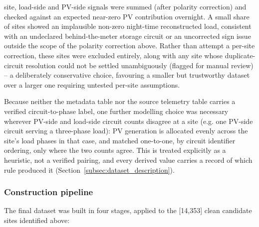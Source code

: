 \begin{enumerate}
    site, load-side and PV-side signals were summed (after polarity
    correction) and checked against an expected near-zero PV contribution
    overnight. A small share of sites showed an implausible non-zero
    night-time reconstructed load, consistent with an undeclared
    behind-the-meter storage circuit or an uncorrected sign issue outside
    the scope of the polarity correction above. Rather than attempt a
    per-site correction, these sites were excluded entirely, along with
    any site whose duplicate-circuit resolution could not be settled
    unambiguously (flagged for manual review) -- a deliberately
    conservative choice, favouring a smaller but trustworthy dataset over
    a larger one requiring untested per-site assumptions.
\end{enumerate}

Because neither the metadata table nor the source telemetry table carries
a verified circuit-to-phase label, one further modelling choice was
necessary wherever PV-side and load-side circuit counts disagree at a
site (e.g. one PV-side circuit serving a three-phase load): PV generation
is allocated evenly across the site's load phases in that case, and
matched one-to-one, by circuit identifier ordering, only where the two
counts agree. This is treated explicitly as a heuristic, not a verified
pairing, and every derived value carries a record of which rule produced
it (Section~\ref{subsec:dataset_description}).

\subsubsection*{Construction pipeline}
The final dataset was built in four stages, applied to the [14{,}353]
clean candidate sites identified above:

